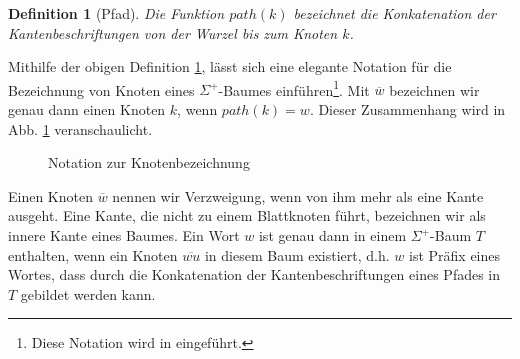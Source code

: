 \documentclass[12pt]{report}
\newtheorem{definition}{Definition}
\begin{document}
\begin{definition}[Pfad]
Die Funktion $path(k)$ bezeichnet die Konkatenation der Kantenbeschriftungen von der Wurzel bis zum Knoten $k$.
\label{def:Pfad}
\end{definition}

Mithilfe der obigen Definition \ref{def:Pfad}, lässt sich eine elegante Notation für die Bezeichnung von Knoten eines $\Sigma^+$-Baumes einführen\footnote{Diese Notation wird in \cite{Ukkonen1995} eingeführt.}. Mit $\overline{w}$ bezeichnen wir genau dann einen Knoten $k$, wenn $path(k) = w$. Dieser Zusammenhang wird in Abb. \ref{fig:NotationZurKnotenbezeichnung} veranschaulicht.

\begin{figure}[htb]
\centering
{}
\caption{Notation zur Knotenbezeichnung}
\label{fig:NotationZurKnotenbezeichnung}
\end{figure}

Einen Knoten $\overline{w}$ nennen wir Verzweigung, wenn von ihm mehr als eine Kante ausgeht. Eine Kante, die nicht zu einem Blattknoten führt, bezeichnen wir als innere Kante eines Baumes. Ein Wort $w$ ist genau dann in einem $\Sigma^+$-Baum $T$ enthalten, wenn ein Knoten $\overline{wu}$ in diesem Baum existiert, d.h. $w$ ist Präfix eines Wortes, dass durch die Konkatenation der Kantenbeschriftungen eines Pfades in $T$ gebildet werden kann.

\end{document}
